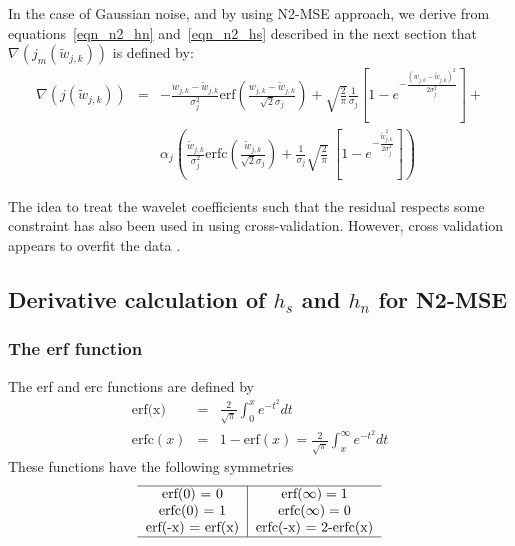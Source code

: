 In the case of Gaussian noise, and by using N2-MSE approach, 
we derive from equations~\ref{eqn_n2_hn} and~\ref{eqn_n2_hs} described 
in the next section that
 $\nabla(j_m(\tilde w_{j,k}))$ 
is defined by:
\begin{eqnarray}
\nabla(j(\tilde w_{j,k})) & = &  
- \frac{w_{j,k} - \tilde w_{j,k}}{\sigma_j^2} 
\mbox{erf}\left(\frac{w_{j,k} - \tilde w_{j,k}}{\sqrt{2}\sigma_j}\right) + 
\sqrt{\frac
{2}{\pi}}\frac{1}{\sigma_j}
\left[1 - e^{-\frac{(w_{j,k} - \tilde w_{j,k})^{2}}{2\sigma_j^{2}}}\right]
+   \nonumber \\
& & 
 \alpha_j \left( \frac{\tilde w_{j,k}}{\sigma_j^{2}}
\mbox{erfc}\left(\frac{\tilde w_{j,k}}{\sqrt{2}\sigma_j}\right)
    + \frac{1}{\sigma_j} \sqrt{\frac{2}{\pi} } \:
      \left[1 - e^{-\frac{\tilde w_{j,k}^{2}}{2\sigma_j^{2}}}\right]\right)
\end{eqnarray}

The idea to treat the wavelet coefficients
such that the residual respects some constraint has also been used in
\cite{wave:nason94,wave:nason96,wave:amato97b} using cross-validation. 
However, 
cross validation appears to overfit the data \cite{wave:strang96}.


\subsection{Derivative calculation of $h_s$ and $h_n$ for N2-MSE}
\subsubsection*{The erf function}
 The erf and erc functions are defined by  
\begin{eqnarray}
  \mbox{erf(x)} & = & \frac{2}{\sqrt{\pi}}\int_{0}^{x} e^{-t^{2}} dt \nonumber \\ 
   \mbox{erfc}(x) & = & 1-\mbox{erf}(x) = \frac{2}{\sqrt{\pi}}\int_{x}^{\infty} e^{-t^{2}} dt 
\end{eqnarray}
These functions have the following symmetries
 \begin{eqnarray}
   \begin{tabular}{c|c} 
   \hline
    \mbox{erf}(0) = 0         & $ \mbox{erf}(\infty) = 1 $  \\
   \mbox{erfc}(0) = 1        & $  \mbox{erfc}(\infty) = 0 $ \\
   \mbox{erf}(-x) = \mbox{erf}(x)   &   \mbox{erfc}(-x) = 2-\mbox{erfc}(x) \\
   \hline
   \end{tabular}
\end{eqnarray}

